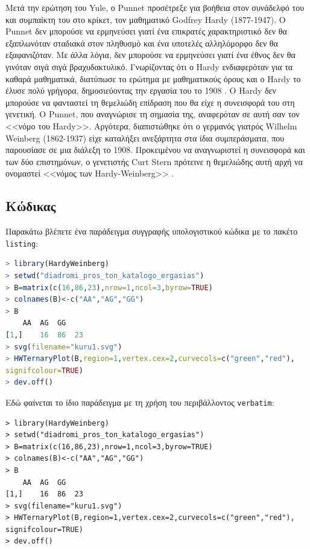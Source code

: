 \begin{refsection}
Μετά την ερώτηση του Yule, ο Punnet προσέτρεξε για βοήθεια στον συνάδελφό του και συμπαίκτη του
στο κρίκετ, τον μαθηματικό Godfrey Hardy (1877-1947). Ο Punnet δεν μπορούσε να ερμηνεύσει γιατί
ένα επικρατές χαρακτηριστικό δεν θα εξαπλωνόταν σταδιακά στον πληθυσμό και ένα υποτελές
αλληλόμορφο δεν θα εξαφανιζόταν. Με άλλα λόγια, δεν μπορούσε να ερμηνεύσει γιατί ένα έθνος δεν θα
γινόταν σιγά σιγά βραχυδακτυλικό. Γνωρίζοντας ότι ο Hardy ενδιαφερόταν για τα
καθαρά μαθηματικά, διατύπωσε το ερώτημα με μαθηματικούς όρους και ο Hardy το έλυσε πολύ γρήγορα,
δημοσιεύοντας την εργασία του το 1908 \cite{pmid15369635, pmid17779291}. Ο Hardy δεν μπορούσε να
φανταστεί τη θεμελιώδη επίδραση που θα είχε η συνεισφορά του στη γενετική. Ο Punnet, που
αναγνώρισε τη σημασία της, αναφερόταν σε αυτή σαν τον <<νόμο του Hardy>>. Αργότερα, διαπιστώθηκε
ότι ο γερμανός γιατρός Wilhelm Weinberg (1862-1937) είχε καταλήξει ανεξάρτητα στα ίδια
συμπεράσματα, που παρουσίασε σε μια διάλεξη το 1908. Προκειμένου να αναγνωριστεί η συνεισφορά και
των δύο επιστημόνων, ο γενετιστής Curt Stern πρότεινε η θεμελιώδης αυτή αρχή να ονομαστεί <<νόμος
των Hardy-Weinberg>> \cite{9780470464670}.
\subsection{Κώδικας}
\label{subsec:code}
Παρακάτω βλέπετε ένα παράδειγμα συγγραφής υπολογιστικού κώδικα με το πακέτο \texttt{listing}:
\begin{lstlisting}[language=R]
> library(HardyWeinberg)
> setwd("diadromi_pros_ton_katalogo_ergasias")
> B=matrix(c(16,86,23),nrow=1,ncol=3,byrow=TRUE)
> colnames(B)<-c("AA","AG","GG")
> B
	AA	AG	GG
[1,]	16	86	23
> svg(filename="kuru1.svg")
> HWTernaryPlot(B,region=1,vertex.cex=2,curvecols=c("green","red"),
signifcolour=TRUE)
> dev.off()
\end{lstlisting}

Εδώ φαίνεται το ίδιο παράδειγμα με τη χρήση του περιβάλλοντος \texttt{verbatim}:
\begin{verbatim}
> library(HardyWeinberg)
> setwd("diadromi_pros_ton_katalogo_ergasias")
> B=matrix(c(16,86,23),nrow=1,ncol=3,byrow=TRUE)
> colnames(B)<-c("AA","AG","GG")
> B
	AA	AG	GG
[1,]	16	86	23
> svg(filename="kuru1.svg")
> HWTernaryPlot(B,region=1,vertex.cex=2,curvecols=c("green","red"),
signifcolour=TRUE)
> dev.off()
\end{verbatim}


\end{refsection}
